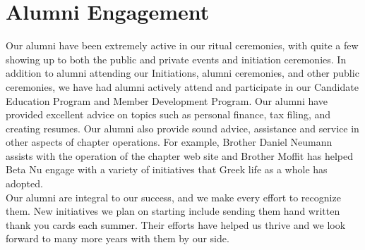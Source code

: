   \section*{Alumni Engagement}
    Our alumni have been extremely active in our ritual ceremonies, with quite a few showing up to both the public and private events and initiation ceremonies. In addition to alumni attending our Initiations, alumni ceremonies, and other public ceremonies, we have had alumni actively attend and participate in our Candidate Education Program and Member Development Program. Our alumni have provided excellent advice on topics such as personal finance, tax filing, and creating resumes. Our alumni also provide sound advice, assistance and service in other aspects of chapter operations. For example, Brother Daniel Neumann assists with the operation of the chapter web site and Brother Moffit has helped Beta Nu engage with a variety of initiatives that Greek life as a whole has adopted.  \\

    Our alumni are integral to our success, and we make every effort to recognize them. New initiatives we plan on starting include sending them hand written thank you cards each summer. Their efforts have helped us thrive and we look forward to many more years with them by our side.